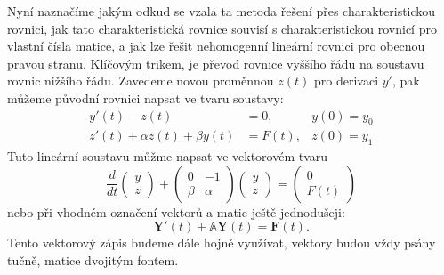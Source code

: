 \documentclass[a4paper, 12pt]{book}
\theoremstyle{definition}
\def\vc#1{\mathbf{\boldsymbol{#1}}}     %
\def\tn#1{{\mathbb{#1}}}    %
\begin{document}
Nyní naznačíme jakým odkud se vzala ta metoda řešení přes charakteristickou rovnici, jak tato charakteristická rovnice souvisí s charakteristickou rovnicí pro vlastní čísla matice,
a jak lze řešit nehomogenní lineární rovnici pro obecnou pravou stranu. Klíčovým trikem, je převod rovnice vyššího řádu na soustavu rovnic nižšího řádu. Zavedeme novou proměnnou $z(t)$ pro derivaci $y'$,
pak můžeme původní rovnici napsat ve tvaru soustavy:
\begin{align}
   y'(t) - z(t) &= 0, & y(0) = y_0\\
   z'(t) + \alpha z(t) + \beta y(t) &= F(t), & z(0)= y_1
\end{align}
Tuto lineární soustavu můžme napsat ve vektorovém tvaru
\[
    \frac{d}{dt}    
    \begin{pmatrix}
       y \\ z
    \end{pmatrix}
    +
    \begin{pmatrix}
        0  & -1\\
        \beta & \alpha
    \end{pmatrix}
    \begin{pmatrix}
        y \\ z
    \end{pmatrix}
    =
    \begin{pmatrix}
     0 \\ F(t)
    \end{pmatrix}
\]
nebo při vhodném označení vektorů a matic ještě jednodušeji:
\[
    \vc Y'(t) + \tn A \vc Y(t) = \vc F(t).
\]
Tento vektorový zápis budeme dále hojně využívat, vektory budou vždy psány tučně, matice dvojitým fontem.



\end{document}
